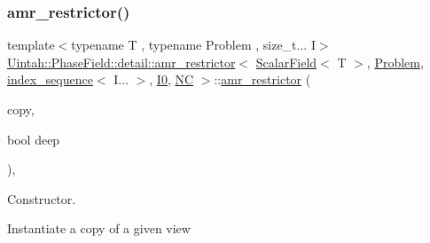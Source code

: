 \subsubsection{\texorpdfstring{amr\+\_\+restrictor()}{amr\_restrictor()}\hspace{0.1cm}{\footnotesize\ttfamily [1/4]}}
{\footnotesize\ttfamily template$<$typename T , typename Problem , size\+\_\+t... I$>$ \\
\hyperlink{classUintah_1_1PhaseField_1_1detail_1_1amr__restrictor}{Uintah\+::\+Phase\+Field\+::detail\+::amr\+\_\+restrictor}$<$ \hyperlink{structUintah_1_1PhaseField_1_1ScalarField}{Scalar\+Field}$<$ T $>$, \hyperlink{classUintah_1_1PhaseField_1_1Problem}{Problem}, \hyperlink{namespaceUintah_1_1PhaseField_a237de804d99512e50613aff7c94a9461}{index\+\_\+sequence}$<$ I... $>$, \hyperlink{namespaceUintah_1_1PhaseField_a547ce3002aa97fbd3ef3192a6eec8406abdd8ebcbdfd71d1125937e3012dc45fb}{I0}, \hyperlink{namespaceUintah_1_1PhaseField_a33d355affda78a83f45755ba8388cedda77924170fe82bfd58b74ca3e44139718}{NC} $>$\+::\hyperlink{classUintah_1_1PhaseField_1_1detail_1_1amr__restrictor}{amr\+\_\+restrictor} (\begin{DoxyParamCaption}\item[{const \hyperlink{classUintah_1_1PhaseField_1_1detail_1_1amr__restrictor}{amr\+\_\+restrictor}$<$ \hyperlink{structUintah_1_1PhaseField_1_1ScalarField}{Scalar\+Field}$<$ T $>$, \hyperlink{classUintah_1_1PhaseField_1_1Problem}{Problem}, \hyperlink{namespaceUintah_1_1PhaseField_a237de804d99512e50613aff7c94a9461}{index\+\_\+sequence}$<$ I... $>$, \hyperlink{namespaceUintah_1_1PhaseField_a547ce3002aa97fbd3ef3192a6eec8406abdd8ebcbdfd71d1125937e3012dc45fb}{I0}, \hyperlink{namespaceUintah_1_1PhaseField_a33d355affda78a83f45755ba8388cedda77924170fe82bfd58b74ca3e44139718}{NC} $>$ $\ast$}]{copy,  }\item[{bool}]{deep }\end{DoxyParamCaption})\hspace{0.3cm}{\ttfamily [inline]}, {\ttfamily [protected]}}



Constructor. 

Instantiate a copy of a given view


